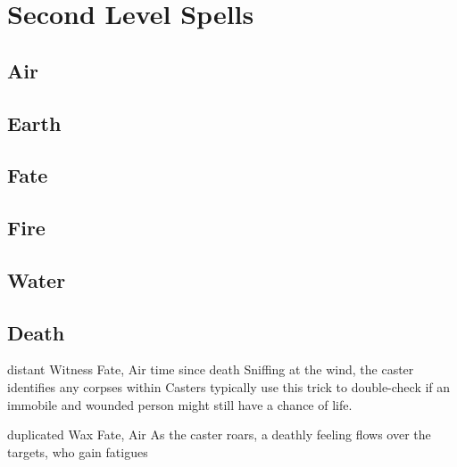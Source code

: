 \section{Second Level Spells}

\begin{multicols}{2}

\subsection{Air}


\subsection{Earth}


\subsection{Fate}


\subsection{Fire}


\subsection{Water}


\subsection{Death}


  {distant}%
  {Witness}%
  {Fate, Air}%
  {time since death}%
  {Sniffing at the wind, the caster identifies any corpses within \spellRange}%
  {
    Casters typically use this trick to double-check if an immobile and wounded person might still have a chance of life.
  }

  {duplicated}%
  {Wax}%
  {Fate, Air}%
  {}%
  {As the caster roars, a deathly feeling flows over the targets, who gain  \glspl{fatigue}}%
  {}


\end{multicols}
